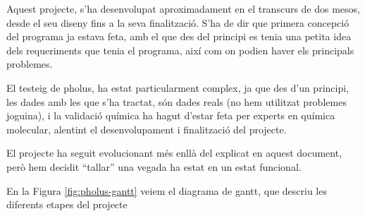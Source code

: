 Aquest projecte, s'ha desenvolupat aproximadament en el transcurs de dos mesos,
desde el seu diseny fins a la seva finalització.  S'ha de dir que primera
concepció del programa ja estava feta, amb el que des del principi es tenia una
petita idea dels requeriments que tenia el programa, així com on podien haver
els principals problemes.

El testeig de pholus, ha estat particularment complex, ja que des d'un principi,
les dades amb les que s'ha tractat, són dades reals (no hem utilitzat problemes
joguina), i la validació química ha hagut d'estar feta per experts en química
molecular, alentint el desenvolupament i finalització  del projecte.

El projecte ha seguit evolucionant més enllà del explicat en aquest document,
però hem decidit ``tallar'' una vegada ha estat en un estat funcional.

En la Figura \ref{fig:pholus-gantt} veiem el diagrama de gantt, que descriu les
diferents etapes del projecte 

